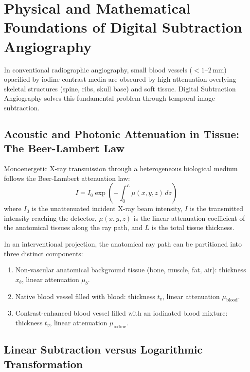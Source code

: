 \documentclass[11pt,a4paper]{article}
\begin{document}
\newpage
\section{Physical and Mathematical Foundations of Digital Subtraction Angiography}

In conventional radiographic angiography, small blood vessels ($< 1\text{--}2\,\text{mm}$) opacified by iodine contrast media are obscured by high-attenuation overlying skeletal structures (spine, ribs, skull base) and soft tissue. Digital Subtraction Angiography solves this fundamental problem through temporal image subtraction.

\subsection{Acoustic and Photonic Attenuation in Tissue: The Beer-Lambert Law}

Monoenergetic X-ray transmission through a heterogeneous biological medium follows the Beer-Lambert attenuation law:
\begin{equation}
    I = I_0 \exp\left( -\int_0^L \mu(x,y,z) \, dz \right)
\end{equation}
where $I_0$ is the unattenuated incident X-ray beam intensity, $I$ is the transmitted intensity reaching the detector, $\mu(x,y,z)$ is the linear attenuation coefficient of the anatomical tissues along the ray path, and $L$ is the total tissue thickness.

In an interventional projection, the anatomical ray path can be partitioned into three distinct components:
\begin{enumerate}[leftmargin=*]
    \item Non-vascular anatomical background tissue (bone, muscle, fat, air): thickness $x_b$, linear attenuation $\mu_b$.
    \item Native blood vessel filled with blood: thickness $t_v$, linear attenuation $\mu_{\text{blood}}$.
    \item Contrast-enhanced blood vessel filled with an iodinated blood mixture: thickness $t_v$, linear attenuation $\mu_{\text{iodine}}$.
\end{enumerate}

\subsection{Linear Subtraction versus Logarithmic Transformation}
\end{document}
